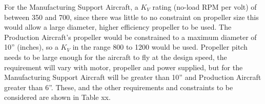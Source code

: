 For the Manufacturing Support Aircraft, a $K_V$ rating (no-load RPM per volt) of between 350 and 700, since there was little to no constraint on propeller size this would allow a large diameter, higher efficiency propeller to be used. The Production Aircraft’s propeller would be constrained to a maximum diameter of 10” (inches), so a $K_V$ in the range 800 to 1200 would be used. Propeller pitch needs to be large enough for the aircraft to fly at the design speed, the requirement will vary with motor, propeller and power supplied, but for the Manufacturing Support Aircraft will be greater than 10” and Production Aircraft greater than 6”. These, and the other requirements and constraints to be considered are shown in Table xx.

%

